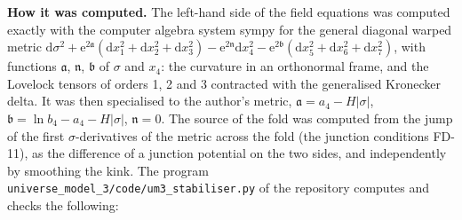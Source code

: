 \documentclass[
  10pt,
]{article}
\begin{document}
\textbf{How it was computed.} The left-hand side of the field equations
was computed exactly with the computer algebra system sympy for the
general diagonal warped metric
\(\mathrm{d}\sigma^2 + \mathrm{e}^{2\mathfrak{a}}(\mathrm{d}x_1^2 + \mathrm{d}x_2^2 + \mathrm{d}x_3^2) - \mathrm{e}^{2\mathfrak{n}}\mathrm{d}x_4^2 - \mathrm{e}^{2\mathfrak{b}}(\mathrm{d}x_5^2 + \mathrm{d}x_6^2 + \mathrm{d}x_7^2)\),
with functions \(\mathfrak{a}\), \(\mathfrak{n}\), \(\mathfrak{b}\) of
\(\sigma\) and \(x_4\): the curvature in an orthonormal frame, and the
Lovelock tensors of orders 1, 2 and 3 contracted with the generalised
Kronecker delta. It was then specialised to the author's metric,
\(\mathfrak{a} = a_4 - H\lvert\sigma\rvert\),
\(\mathfrak{b} = \ln b_4 - a_4 - H\lvert\sigma\rvert\),
\(\mathfrak{n} = 0\). The source of the fold was computed from the jump
of the first \(\sigma\)-derivatives of the metric across the fold (the
junction conditions FD-11), as the difference of a junction potential on
the two sides, and independently by smoothing the kink. The program
\texttt{universe\_model\_3/code/um3\_stabiliser.py} of the repository
computes and checks the following:
\end{document}
